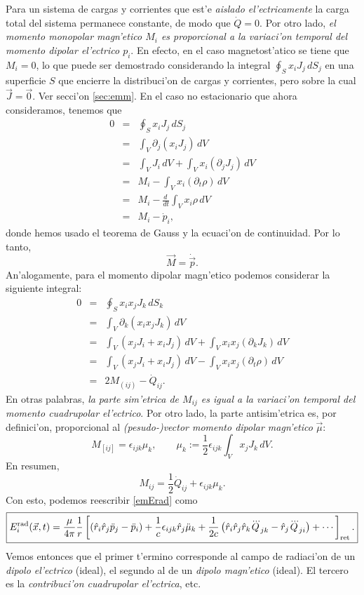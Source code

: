 Para un sistema de cargas y corrientes que est'e \textit{aislado el'ectricamente} la carga total del sistema permanece constante, de modo que $\dot{Q}=0$. Por otro lado, \textit{el momento monopolar magn'etico $M_i$ es proporcional a la variaci'on temporal del momento dipolar el'ectrico $p_i$}. En efecto, en el caso magnetost'atico se tiene que $M_i=0$, lo que puede ser demostrado considerando la integral $\oint_Sx_iJ_j\, dS_j$ en una superficie $S$ que encierre la distribuci'on de cargas y corrientes, pero sobre la cual $\vec{J}=\vec{0}$. Ver secci'on \ref{sec:emm}. En el caso no estacionario que ahora consideramos, tenemos que
\begin{eqnarray}
 0&=&\oint_Sx_iJ_j\, dS_j\\
&=&\int_V\partial_j(x_iJ_j)\,dV \\
&=&\int_VJ_i\,dV+\int_Vx_i(\partial_jJ_j)\,dV \\
&=&M_i-\int_Vx_i(\partial_t\rho)\,dV \\
&=&M_i-\frac{d\ }{dt}\int_Vx_i\rho\,dV \\
&=&M_i-\dot{p}_i,
\end{eqnarray}
donde hemos usado el teorema de Gauss y la ecuaci'on de continuidad. Por lo tanto,
\begin{equation}
 \vec{M}=\dot{\vec{p}}.
\end{equation}
An'alogamente, para el momento dipolar magn'etico podemos considerar la siguiente integral:
\begin{eqnarray}
 0&=&\oint_Sx_ix_jJ_k\, dS_k\\
&=&\int_V\partial_k(x_ix_jJ_k)\,dV \\
&=&\int_V(x_jJ_i+x_iJ_j)\,dV+\int_Vx_ix_j(\partial_kJ_k)\,dV \\
&=&\int_V(x_jJ_i+x_iJ_j)\,dV-\int_Vx_ix_j(\partial_t\rho)\,dV \\
&=&2M_{(ij)}-\dot{Q}_{ij}.
\end{eqnarray}
En otras palabras, \textit{la parte sim'etrica de $M_{ij}$ es igual a la variaci'on temporal del momento cuadrupolar el'ectrico}. Por otro lado, la parte antisim'etrica es, por definici'on, proporcional al \textit{(pesudo-)vector momento dipolar magn'etico} $\vec{\mu}$:
\begin{equation}
 M_{[ij]}=\epsilon_{ijk}\mu_k, \qquad \mu_k:=\frac{1}{2}\epsilon_{ijk}\int_Vx_jJ_k\,dV.
\end{equation}
En resumen,
\begin{equation}
 M_{ij}=\frac{1}{2}\dot{Q}_{ij}+\epsilon_{ijk}\mu_k.
\end{equation}
Con esto, podemos reescribir \eqref{emErad} como
\begin{equation}
\boxed{E_i^{\rm rad}(\vec{x},t)=\frac{\mu}{4\pi}\frac{1}{r}\left[\left(\hat{r}_i\hat{r}_j\ddot{p}_j-\ddot{p}_i\right)+\frac{1}{c}\epsilon_{ijk}\hat{r}_j\ddot{\mu}_k+\frac{1}{2c}\left(\hat{r}_i\hat{r}_j\hat{r}_k\dddot{Q}_{jk} -\hat{r}_j\dddot{Q}_{ji}\right)+\cdots\right]_{\rm ret} .} \label{emErad2}
\end{equation}
Vemos entonces que el primer t'ermino corresponde al campo de radiaci'on de un \textit{dipolo el'ectrico} (ideal), el segundo al de un \textit{dipolo magn'etico} (ideal). El tercero es la \textit{contribuci'on cuadrupolar el'ectrica}, etc.

